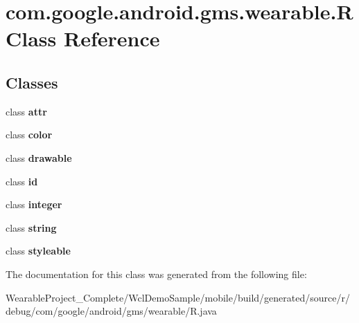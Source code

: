 \hypertarget{classcom_1_1google_1_1android_1_1gms_1_1wearable_1_1R}{}\section{com.\+google.\+android.\+gms.\+wearable.\+R Class Reference}
\label{classcom_1_1google_1_1android_1_1gms_1_1wearable_1_1R}
\subsection*{Classes}
\begin{DoxyCompactItemize}
\item 
class {\bfseries attr}
\item 
class {\bfseries color}
\item 
class {\bfseries drawable}
\item 
class {\bfseries id}
\item 
class {\bfseries integer}
\item 
class {\bfseries string}
\item 
class {\bfseries styleable}
\end{DoxyCompactItemize}


The documentation for this class was generated from the following file\+:\begin{DoxyCompactItemize}
\item 
Wearable\+Project\+\_\+\+Complete/\+Wcl\+Demo\+Sample/mobile/build/generated/source/r/debug/com/google/android/gms/wearable/R.\+java\end{DoxyCompactItemize}
